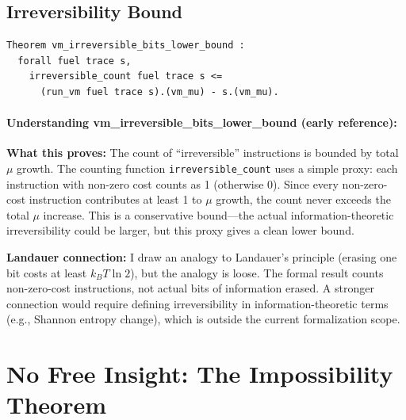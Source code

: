 \subsection{Irreversibility Bound}

\begin{theorem}[Irreversibility]
\begin{lstlisting}
Theorem vm_irreversible_bits_lower_bound :
  forall fuel trace s,
    irreversible_count fuel trace s <=
      (run_vm fuel trace s).(vm_mu) - s.(vm_mu).
\end{lstlisting}
\end{theorem}

\paragraph{Understanding vm\_irreversible\_bits\_lower\_bound (early reference):}

\textbf{What this proves:} The count of ``irreversible'' instructions is bounded by total $\mu$ growth. The counting function \texttt{irreversible\_count} uses a simple proxy: each instruction with non-zero cost counts as 1 (otherwise 0). Since every non-zero-cost instruction contributes at least 1 to $\mu$ growth, the count never exceeds the total $\mu$ increase. This is a conservative bound---the actual information-theoretic irreversibility could be larger, but this proxy gives a clean lower bound.

\textbf{Landauer connection:} I draw an analogy to Landauer's principle (erasing one bit costs at least $k_B T \ln 2$), but the analogy is loose. The formal result counts non-zero-cost instructions, not actual bits of information erased. A stronger connection would require defining irreversibility in information-theoretic terms (e.g., Shannon entropy change), which is outside the current formalization scope.

\section{No Free Insight: The Impossibility Theorem}


